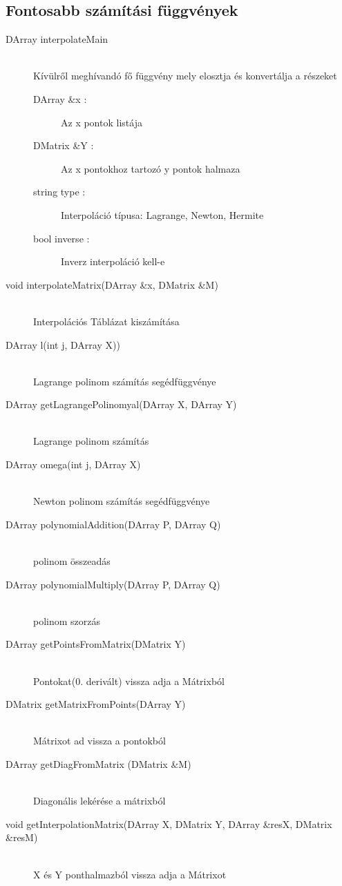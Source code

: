 \subsection{Fontosabb számítási függvények}
	\begin{description}
		\item[DArray interpolateMain] 
			\hfill \\ Kívülről meghívandó fő függvény mely elosztja és konvertálja a részeket
			\begin{description}
			  \item[DArray \&x :] Az x pontok listája 
			  \item[DMatrix \&Y :] Az x pontokhoz tartozó y pontok halmaza
			  \item[string type :] Interpoláció típusa: Lagrange, Newton, Hermite
			  \item[bool inverse :] Inverz interpoláció kell-e
			\end{description}
		\item[void interpolateMatrix(DArray \&x, 	DMatrix \&M)] \hfill \\ 
			Interpolációs Táblázat kiszámítása
		\item[DArray l(int j, DArray X))] \hfill \\ 
			Lagrange polinom számítás segédfüggvénye
		\item[DArray getLagrangePolinomyal(DArray X, DArray Y)] \hfill \\ 
			Lagrange polinom számítás
		\item[DArray omega(int j, DArray X)] \hfill \\ 	   Newton polinom számítás segédfüggvénye
		\item[DArray polynomialAddition(DArray P, DArray Q)] \hfill \\ 
			polinom összeadás
		\item[DArray polynomialMultiply(DArray P, DArray Q)] \hfill \\ 
			polinom szorzás
		\item[DArray getPointsFromMatrix(DMatrix Y)] \hfill \\ 
			Pontokat(0. derivált) vissza adja a Mátrixból
		\item[DMatrix getMatrixFromPoints(DArray Y)] \hfill \\ 
			Mátrixot ad vissza a pontokból
		\item[DArray getDiagFromMatrix (DMatrix \&M)] 
		\hfill \\
			Diagonális lekérése a mátrixból
		\item[void getInterpolationMatrix(DArray X, DMatrix Y, DArray \&resX, DMatrix \&resM)] \hfill \\
			 X és Y ponthalmazból vissza adja a Mátrixot 
	\end{description}
